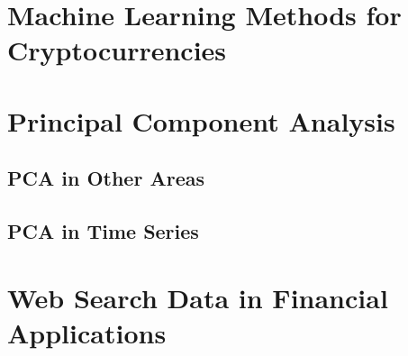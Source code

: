 \section{Machine Learning Methods for Cryptocurrencies}
\label{sec:ml}

\section{Principal Component Analysis}
\label{sec:pca}


\subsection{PCA in Other Areas}

\subsection{PCA in Time Series}


\section{Web Search Data in Financial Applications}





